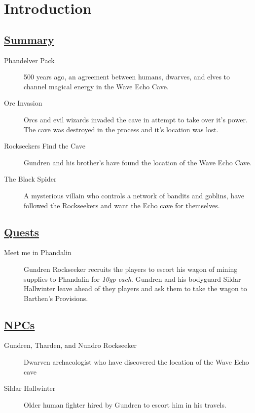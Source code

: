 	\section{Introduction}
\subsection*{\underline{Summary}}
\begin{description}
	\item[Phandelver Pack] 500 years ago, an agreement between humans, dwarves, and elves to channel magical energy in the Wave Echo Cave.
	\item[Orc Invasion] Orcs and evil wizards invaded the cave in attempt to take over it's power. The cave was destroyed in the process and it's location was lost.
	\item[Rockseekers Find the Cave] Gundren and his brother's have found the location of the Wave Echo Cave.
	\item[The Black Spider] A mysterious villain who controls a network of bandits and goblins, have followed the Rockseekers and want the Echo cave for themselves.
\end{description}

\subsection*{\underline{Quests}}
\begin{description}
	\item[Meet me in Phandalin] Gundren Rockseeker recruits the players to escort his wagon of mining supplies to Phandalin for \emph{10gp each}. Gundren and his bodyguard Sildar Hallwinter leave ahead of they players and ask them to take the wagon to Barthen's Provisions.
\end{description}

\subsection*{\underline{NPCs}}
\begin{description}
	\item[Gundren, Tharden, and Nundro Rockseeker] Dwarven archaeologist who have discovered the location of the Wave Echo cave
	\item[Sildar Hallwinter] Older human fighter hired by Gundren to escort him in his travels.
\end{description}

\vfill